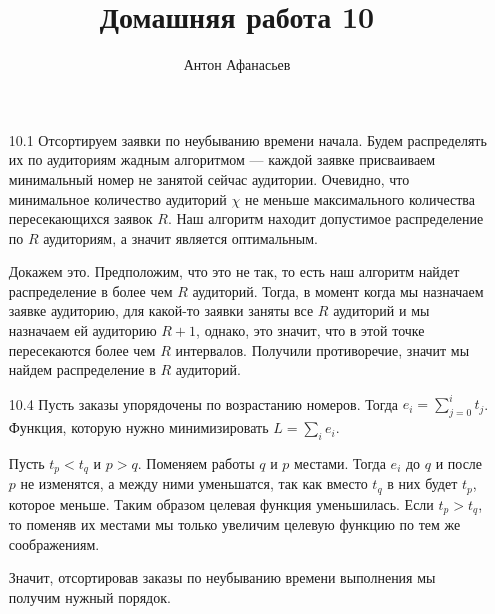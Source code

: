 \documentclass[10pt]{article}
\begin{document}
\title{Домашняя работа 10}
\author{Антон Афанасьев}
\maketitle

\begin{enumerate}

\item[10.1] Отсортируем заявки по неубыванию времени начала. Будем распределять их по аудиториям жадным алгоритмом --- каждой заявке присваиваем минимальный номер не занятой сейчас аудитории. Очевидно, что минимальное количество аудиторий $\chi$ не меньше максимального количества пересекающихся заявок $R$. Наш алгоритм находит допустимое распределение по $R$ аудиториям, а значит является оптимальным.

Докажем это. Предположим, что это не так, то есть наш алгоритм найдет распределение в более чем $R$ аудиторий. Тогда, в момент когда мы назначаем заявке аудиторию, для какой-то заявки заняты все $R$ аудиторий и мы назначаем ей аудиторию $R+1$, однако, это значит, что в этой точке пересекаются более чем $R$ интервалов. Получили противоречие, значит мы найдем распределение в $R$ аудиторий.

\item[10.4] Пусть заказы упорядочены по возрастанию номеров. Тогда $e_i = \sum_{j=0}^i t_j$. Функция, которую нужно минимизировать $L = \sum_i e_i$.

Пусть $t_p < t_q$ и $p > q$. Поменяем работы $q$ и $p$ местами. Тогда $e_i$ до $q$ и после $p$ не изменятся, а между ними уменьшатся, так как вместо $t_q$ в них будет $t_p$, которое меньше. Таким образом целевая функция уменьшилась. Если $t_p > t_q$, то поменяв их местами мы только увеличим целевую функцию по тем же соображениям. 

Значит, отсортировав заказы по неубыванию времени выполнения мы получим нужный порядок.

\end{enumerate}
\end{document}
